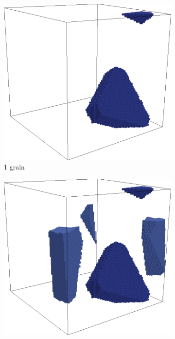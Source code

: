 \documentclass[3p,12pt]{elsarticle}
\begin{document}
\begin{figure}[H]
 \centering
  \begin{subfigure}[b]{0.23\linewidth}
  \includegraphics[width=1\linewidth]{step1}
  \caption{1 grain}
  \end{subfigure}
  \quad
  \begin{subfigure}[b]{0.23\linewidth}
  \includegraphics[width=1\linewidth]{step2}

\end{subfigure}
\end{figure}
\end{document}
